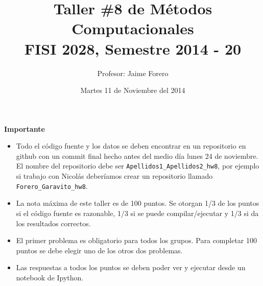 \documentclass{article}
\title{Taller \#8 de M\'etodos Computacionales\\ FISI 2028, Semestre 2014 - 20}
\author{Profesor: Jaime Forero}
\date{Martes 11 de Noviembre del 2014}
\begin{document}
\maketitle
\thispagestyle{empty}


{\bf Importante}
\begin{itemize}

\item Todo el c\'odigo fuente y los datos se deben encontrar en un
  repositorio en github con un commit final hecho antes del medio
  d\'ia lunes 24 de noviembre. El nombre del repositorio debe ser
  \verb"Apellidos1_Apellidos2_hw8", por ejemplo si trabajo con
  Nicol\'as deber\'iamos crear un repositorio llamado
  \verb"Forero_Garavito_hw8".  

\item 
  La nota m\'axima de este taller es de 100 puntos. Se otorgan 1/3
  de los puntos si el c\'odigo fuente es razonable, 1/3 si se puede
  compilar/ejecutar y 1/3 si da los resultados correctos.  

\item
  El primer problema es obligatorio para todos los grupos. Para
  completar 100 puntos se debe elegir uno de los otros dos problemas. 

\item
  Las respuestas a todos los puntos se deben poder ver y ejecutar
  desde un notebook de  Ipython.  
\end{itemize}
\end{document}
